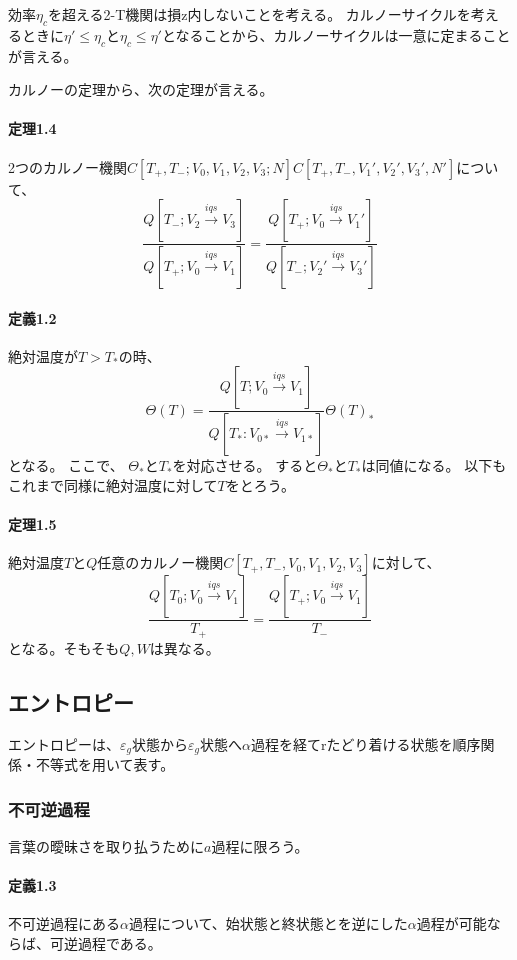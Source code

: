 \documentclass{ltjsarticle}
\begin{document}
効率\(\eta_c\)を超える2-T機関は損z内しないことを考える。
カルノーサイクルを考えるときに\(\eta'\le \eta_c\)と\(\eta_c\le \eta'\)となることから、カルノーサイクルは一意に定まることが言える。

カルノーの定理から、次の定理が言える。
\paragraph{定理1.4}2つのカルノー機関\(C[T_+,T_-;V_0,V_1,V_2,V_3;N]C[T_+,T_-,V_1',V_2',V_3',N']\)について、
\begin{equation}
  \frac{Q[T_-;V_2\xrightarrow{iqs}V_3]}{Q[T_+;V_0\xrightarrow{iqs}V_1]} = \frac{Q[T_+;V_0\xrightarrow{iqs}V_1']}{Q[T_-;V_2'\xrightarrow{iqs}V_3']}
\end{equation}

\paragraph{定義1.2}
絶対温度が\(T>T_\ast\)の時、
\begin{equation}
  \Theta(T) = \frac{Q[T;V_0\xrightarrow{iqs} V_1]}{Q[T_*:V_{0\ast}\xrightarrow{iqs}V_{1\ast}]}\Theta(T)_\ast  
\end{equation}
となる。
ここで、
\(\Theta_\ast\)と\(T_\ast\)を対応させる。
すると\(\Theta_\ast\)と\(T_\ast\)は同値になる。
以下もこれまで同様に絶対温度に対して\(T\)をとろう。
\paragraph{定理1.5}
絶対温度\(T\)と\(Q\)任意のカルノー機関\(C[T_+,T_-,V_0,V_1,V_2,V_3]\)に対して、
\begin{equation}
  \frac{Q[T_0;V_0\xrightarrow{iqs}V_1]}{T_+} = \frac{Q[T_+;V_0\xrightarrow{iqs}V_1]}{T_-}
\end{equation}
となる。そもそも\(Q,W\)は異なる。


\subsection{エントロピー}
エントロピーは、\(\varepsilon_g\)状態から\(\varepsilon_g\)状態へ\(\alpha\)過程を経てrたどり着ける状態を順序関係・不等式を用いて表す。

\subsubsection{不可逆過程}
言葉の曖昧さを取り払うために\(a\)過程に限ろう。
\paragraph{定義1.3}不可逆過程にある\(\alpha\)過程について、始状態と終状態とを逆にした\(\alpha\)過程が可能ならば、可逆過程である。
\end{document}
